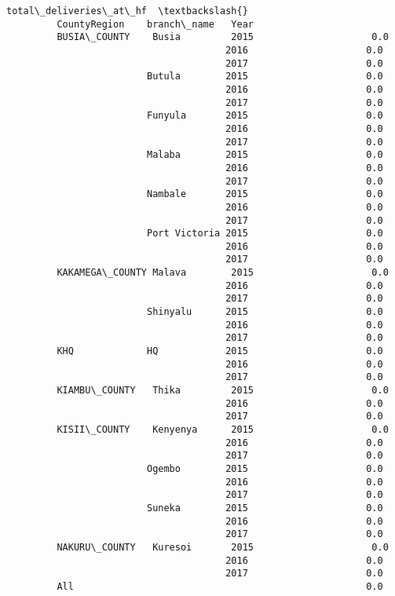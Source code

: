 \documentclass[11pt]{article}
\begin{document}
\begin{Verbatim}[commandchars=\\\{\}]
                                             total\_deliveries\_at\_hf  \textbackslash{}
         CountyRegion    branch\_name   Year                           
         BUSIA\_COUNTY    Busia         2015                     0.0   
                                       2016                     0.0   
                                       2017                     0.0   
                         Butula        2015                     0.0   
                                       2016                     0.0   
                                       2017                     0.0   
                         Funyula       2015                     0.0   
                                       2016                     0.0   
                                       2017                     0.0   
                         Malaba        2015                     0.0   
                                       2016                     0.0   
                                       2017                     0.0   
                         Nambale       2015                     0.0   
                                       2016                     0.0   
                                       2017                     0.0   
                         Port Victoria 2015                     0.0   
                                       2016                     0.0   
                                       2017                     0.0   
         KAKAMEGA\_COUNTY Malava        2015                     0.0   
                                       2016                     0.0   
                                       2017                     0.0   
                         Shinyalu      2015                     0.0   
                                       2016                     0.0   
                                       2017                     0.0   
         KHQ             HQ            2015                     0.0   
                                       2016                     0.0   
                                       2017                     0.0   
         KIAMBU\_COUNTY   Thika         2015                     0.0   
                                       2016                     0.0   
                                       2017                     0.0   
         KISII\_COUNTY    Kenyenya      2015                     0.0   
                                       2016                     0.0   
                                       2017                     0.0   
                         Ogembo        2015                     0.0   
                                       2016                     0.0   
                                       2017                     0.0   
                         Suneka        2015                     0.0   
                                       2016                     0.0   
                                       2017                     0.0   
         NAKURU\_COUNTY   Kuresoi       2015                     0.0   
                                       2016                     0.0   
                                       2017                     0.0   
         All                                                    0.0   
         

\end{Verbatim}
\end{document}
